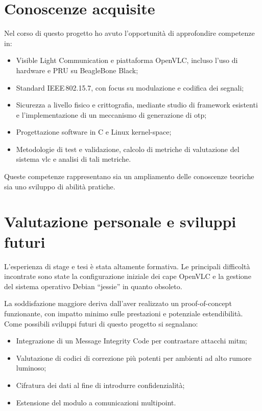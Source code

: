 \section{Conoscenze acquisite}
Nel corso di questo progetto ho avuto l'opportunità di approfondire competenze in:
\begin{itemize}
  \item Visible Light Communication e piattaforma OpenVLC, incluso l'uso di hardware e PRU su BeagleBone Black;
  \item Standard IEEE\,802.15.7, con focus su modulazione e codifica dei segnali;
  \item Sicurezza a livello fisico e crittografia, mediante studio di framework esistenti e l'implementazione di un meccanismo di generazione di \gls{otp};
  \item Progettazione software in C e Linux kernel-space;
  \item Metodologie di test e validazione, calcolo di metriche di valutazione del sistema \gls{vlc} e analisi di tali metriche.
\end{itemize}
Queste competenze rappresentano sia un ampliamento delle conoscenze teoriche sia uno sviluppo di abilità pratiche.

\section{Valutazione personale e sviluppi futuri}
L'esperienza di stage e tesi è stata altamente formativa. Le principali difficoltà incontrate sono state la configurazione iniziale dei cape OpenVLC e la gestione del sistema operativo Debian “jessie” in quanto obsoleto.

La soddisfazione maggiore deriva dall'aver realizzato un proof-of-concept funzionante, con impatto minimo sulle prestazioni e potenziale estendibilità. Come possibili sviluppi futuri di questo progetto si segnalano:
\begin{itemize}
  \item Integrazione di un Message Integrity Code per contrastare attacchi \gls{mitm};
  \item Valutazione di codici di correzione più potenti per ambienti ad alto rumore luminoso;
  \item Cifratura dei dati al fine di introdurre confidenzialità;
  \item Estensione del modulo a comunicazioni multipoint.
\end{itemize}